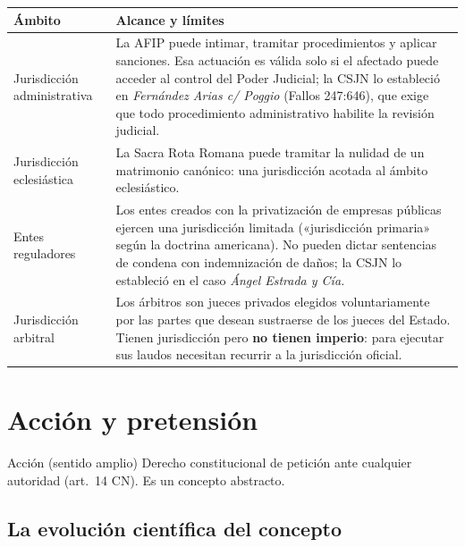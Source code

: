 \documentclass[12pt,oneside]{book}
\renewcommand{\arraystretch}{1.15}
\begin{document}
\begin{table}[H]
\centering
\renewcommand{\arraystretch}{1.25}
\begin{tabularx}{\textwidth}{>{\RaggedRight\arraybackslash}p{}>{\RaggedRight\arraybackslash}X}
\toprule
\textbf{Ámbito} & \textbf{Alcance y límites} \\
\midrule
Jurisdicción administrativa & La AFIP puede intimar, tramitar procedimientos y aplicar sanciones. Esa actuación es válida solo si el afectado puede acceder al control del Poder Judicial; la CSJN lo estableció en \textit{Fernández Arias c/ Poggio} (Fallos 247:646), que exige que todo procedimiento administrativo habilite la revisión judicial. \\
\addlinespace
Jurisdicción eclesiástica & La Sacra Rota Romana puede tramitar la nulidad de un matrimonio canónico: una jurisdicción acotada al ámbito eclesiástico. \\
\addlinespace
Entes reguladores & Los entes creados con la privatización de empresas públicas ejercen una jurisdicción limitada («jurisdicción primaria» según la doctrina americana). No pueden dictar sentencias de condena con indemnización de daños; la CSJN lo estableció en el caso \textit{Ángel Estrada y Cía.} \\
\addlinespace
Jurisdicción arbitral & Los árbitros son jueces privados elegidos voluntariamente por las partes que desean sustraerse de los jueces del Estado. Tienen jurisdicción pero \textbf{no tienen imperio}: para ejecutar sus laudos necesitan recurrir a la jurisdicción oficial. \\
\bottomrule
\end{tabularx}
\end{table}


\section{Acción y pretensión}

\begin{definition}{Acción (sentido amplio)}
Derecho constitucional de petición ante cualquier autoridad (art.~14 CN). Es un concepto abstracto.
\end{definition}

\subsection{La evolución científica del concepto}
\end{document}
